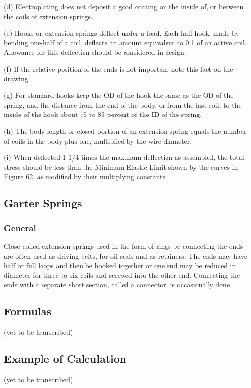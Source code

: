 \documentclass[10pt]{article}
\begin{document}
(d) Electroplating does not deposit a good coating on the inside of, or between the coils of extension springs.

(e) Hooks on extension springs deflect under a load.
Each half hook, made by bending one-half of a coil, deflects an amount equivalent to 0.1 of an active coil.
Allowance for this deflection should be considered in design.

(f) If the relative position of the ends is not important note this fact on the drawing.

(g) For standard hooks keep the OD of the hook the same as the OD of the spring, and the distance from the end of the body, or from the last coil, to the inside of the hook about 75 to 85 percent of the ID of the spring.

(h) The body length or closed portion of an extension spring equals the number of coils in the body plus one, multiplied by the wire diameter.

(i) When deflected 1 1/4 times the maximum deflection as assembled, the total stress should be less than the Minimum Elastic Limit shown by the curves in Figure 62, as modified by their multiplying constants.

\clearpage
\subsection{Garter Springs} %
\subsubsection{General} %
Close coiled extension springs used in the form of rings by connecting the ends are often used as driving belts, for oil seals and as retainers.
The ends may have half or full loops and then be hooked together or one end may be reduced in diameter for three to six coils and screwed into the other end. 
Connecting the ends with a separate short section, called a connector, is occasionally done.

\subsection{Formulas}
(yet to be transcribed)

\subsection{Example of Calculation}
(yet to be transcribed)
\end{document}
